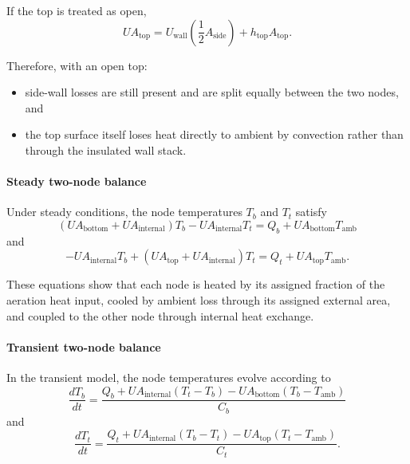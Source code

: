 \documentclass{article}
\begin{document}
If the top is treated as open,
\begin{equation}
UA_{\text{top}}
=
U_{\text{wall}}
\left(
\frac{1}{2}A_{\text{side}}
\right)
+
h_{\text{top}}A_{\text{top}}.
\end{equation}

Therefore, with an open top:
\begin{itemize}
\item side-wall losses are still present and are split equally between the
      two nodes, and
\item the top surface itself loses heat directly to ambient by convection
      rather than through the insulated wall stack.
\end{itemize}

\paragraph{Steady two-node balance}

Under steady conditions, the node temperatures $T_b$ and $T_t$ satisfy
\begin{equation}
(UA_{\text{bottom}}+UA_{\text{internal}})T_b
-
UA_{\text{internal}}T_t
=
Q_b + UA_{\text{bottom}}T_{\text{amb}}
\end{equation}
and
\begin{equation}
-UA_{\text{internal}}T_b
+
(UA_{\text{top}}+UA_{\text{internal}})T_t
=
Q_t + UA_{\text{top}}T_{\text{amb}}.
\end{equation}

These equations show that each node is heated by its assigned fraction of the
aeration heat input, cooled by ambient loss through its assigned external
area, and coupled to the other node through internal heat exchange.

\paragraph{Transient two-node balance}

In the transient model, the node temperatures evolve according to
\begin{equation}
\frac{dT_b}{dt}
=
\frac{
Q_b
+
UA_{\text{internal}}(T_t-T_b)
-
UA_{\text{bottom}}(T_b-T_{\text{amb}})
}{
C_b
}
\end{equation}
and
\begin{equation}
\frac{dT_t}{dt}
=
\frac{
Q_t
+
UA_{\text{internal}}(T_b-T_t)
-
UA_{\text{top}}(T_t-T_{\text{amb}})
}{
C_t
}.
\end{equation}
\end{document}
